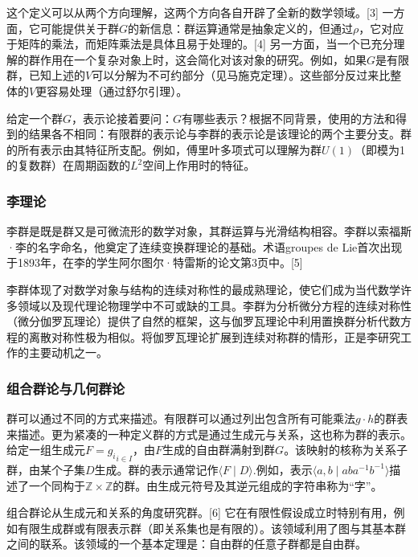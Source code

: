 这个定义可以从两个方向理解，这两个方向各自开辟了全新的数学领域。[3] 一方面，它可能提供关于群$G$的新信息：群运算通常是抽象定义的，但通过$\rho$，它对应于矩阵的乘法，而矩阵乘法是具体且易于处理的。[4] 另一方面，当一个已充分理解的群作用在一个复杂对象上时，这会简化对该对象的研究。例如，如果$G$是有限群，已知上述的$V$可以分解为不可约部分（见马施克定理）。这些部分反过来比整体的$V$更容易处理（通过舒尔引理）。

给定一个群$G$，表示论接着要问：$G$有哪些表示？根据不同背景，使用的方法和得到的结果各不相同：有限群的表示论与李群的表示论是该理论的两个主要分支。群的所有表示由其特征所支配。例如，傅里叶多项式可以理解为群$U(1)$（即模为1的复数群）在周期函数的$L^2$空间上作用时的特征。
\subsubsection{李理论}
李群是既是群又是可微流形的数学对象，其群运算与光滑结构相容。李群以索福斯·李的名字命名，他奠定了连续变换群理论的基础。术语groupes de Lie首次出现于1893年，在李的学生阿尔图尔·特雷斯的论文第3页中。[5]

李群体现了对数学对象与结构的连续对称性的最成熟理论，使它们成为当代数学许多领域以及现代理论物理学中不可或缺的工具。李群为分析微分方程的连续对称性（微分伽罗瓦理论）提供了自然的框架，这与伽罗瓦理论中利用置换群分析代数方程的离散对称性极为相似。将伽罗瓦理论扩展到连续对称群的情形，正是李研究工作的主要动机之一。
\subsubsection{组合群论与几何群论}
群可以通过不同的方式来描述。有限群可以通过列出包含所有可能乘法$g \cdot h$的群表来描述。更为紧凑的一种定义群的方式是通过生成元与关系，这也称为群的表示。给定一组生成元$F = { g_i }_{i \in I}$，由$F$生成的自由群满射到群$G$。该映射的核称为关系子群，由某个子集$D$生成。群的表示通常记作$\langle F \mid D \rangle $.例如，表示$\langle a, b \mid aba^{-1}b^{-1} \rangle$描述了一个同构于$\mathbb{Z} \times \mathbb{Z}$的群。由生成元符号及其逆元组成的字符串称为“字”。

组合群论从生成元和关系的角度研究群。[6] 它在有限性假设成立时特别有用，例如有限生成群或有限表示群（即关系集也是有限的）。该领域利用了图与其基本群之间的联系。该领域的一个基本定理是：自由群的任意子群都是自由群。


